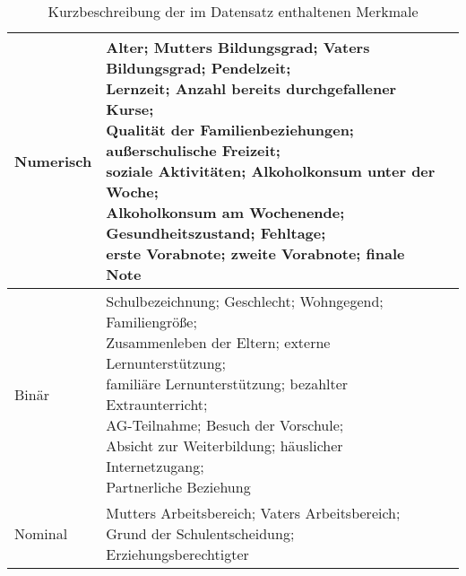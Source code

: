 \begin{table}[htb]
    \centering
    \caption{Kurzbeschreibung der im Datensatz enthaltenen Merkmale}
    \label{tab:Table2.1}
    \begin{tabular}{|l|l|l|}
    \hline
        Numerisch & \makecell[l]{Alter; Mutters Bildungsgrad; Vaters Bildungsgrad; Pendelzeit; \\Lernzeit; Anzahl bereits durchgefallener Kurse; \\Qualität der Familienbeziehungen; außerschulische Freizeit; \\soziale Aktivitäten; Alkoholkonsum unter der Woche; \\Alkoholkonsum am Wochenende; Gesundheitszustand; Fehltage; \\\textbf{erste Vorabnote; zweite Vorabnote; finale Note}} \\ \hline
        Binär & \makecell[l]{Schulbezeichnung; Geschlecht; Wohngegend; Familiengröße; \\Zusammenleben der Eltern; externe Lernunterstützung; \\familiäre Lernunterstützung; bezahlter Extraunterricht; \\AG-Teilnahme; Besuch der Vorschule; \\Absicht zur Weiterbildung; häuslicher Internetzugang; \\Partnerliche Beziehung} \\ \hline
        Nominal & \makecell[l]{Mutters Arbeitsbereich; Vaters Arbeitsbereich; \\Grund der Schulentscheidung; Erziehungsberechtigter} \\ \hline
    \end{tabular}
\end{table}